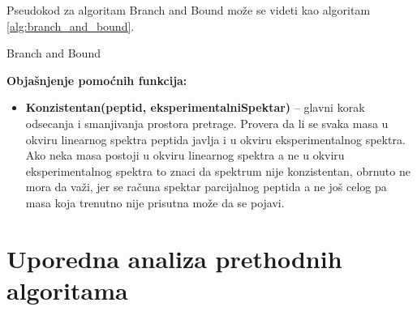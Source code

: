\documentclass[12pt,oneside]{memoir}
\begin{document}
Pseudokod za algoritam Branch and Bound može se videti kao algoritam \ref{alg:branch_and_bound}.

\begin{algorithm}[H]
\label{alg:branch_and_bound}
\caption{Branch and Bound}
\SetAlgoLined
\DontPrintSemicolon
{}
\end{algorithm}

\noindent
\textbf{Objašnjenje pomoćnih funkcija:}
\begin{itemize}
  \item \textbf{Konzistentan(peptid, eksperimentalniSpektar)} – glavni korak odsecanja i smanjivanja prostora pretrage.  Provera da li se svaka masa u okviru linearnog spektra peptida javlja i u okviru eksperimentalnog spektra. Ako neka masa postoji u okviru linearnog spektra a ne u okviru eksperimentalnog spektra to znaci da spektrum nije konzistentan, obrnuto ne mora da važi, jer se računa spektar parcijalnog peptida a ne još celog pa masa koja trenutno nije prisutna može da se pojavi.
\end{itemize}

\section{Uporedna analiza prethodnih algoritama}
\end{document}
